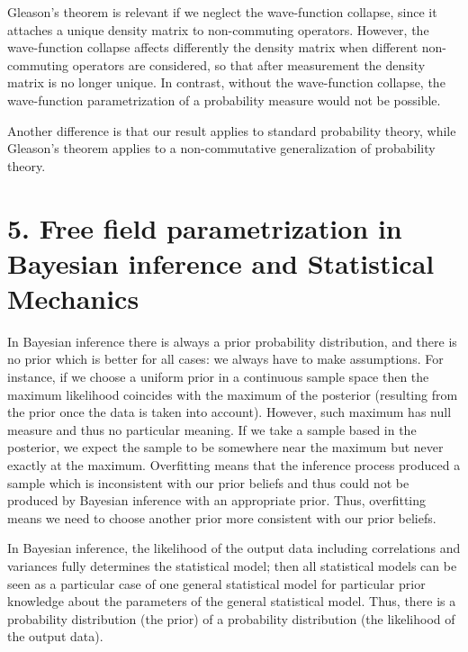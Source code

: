 \documentclass[11pt]{book}
\begin{document}
Gleason's theorem is relevant if we neglect the wave-function collapse,
since it attaches a unique density matrix to non-commuting operators.
However, the wave-function collapse affects differently the density
matrix when different non-commuting operators are considered, so that
after measurement the density matrix is no longer unique. In contrast,
without the wave-function collapse, the wave-function parametrization of
a probability measure would not be possible.

Another difference is that our result applies to standard probability
theory, while Gleason's theorem applies to a non-commutative
generalization of probability theory.

\hypertarget{free-field-parametrization-in-bayesian-inference-and-statistical-mechanics}{%
\section{5. Free field parametrization in Bayesian inference and
Statistical
Mechanics}\label{free-field-parametrization-in-bayesian-inference-and-statistical-mechanics}}

In Bayesian inference there is always a prior probability distribution,
and there is no prior which is better for all
cases\cite{dutchbook}: we
always have to make assumptions. For instance, if we choose a uniform
prior in a continuous sample space then the maximum likelihood coincides
with the maximum of the posterior (resulting from the prior once the
data is taken into account). However, such maximum has null measure and
thus no particular meaning. If we take a sample based in the posterior,
we expect the sample to be somewhere near the maximum but never exactly
at the maximum. Overfitting means that the inference process produced a
sample which is inconsistent with our prior beliefs and thus could not
be produced by Bayesian inference with an appropriate prior. Thus,
overfitting means we need to choose another prior more consistent with
our prior beliefs.

In Bayesian inference, the likelihood of the output data including
correlations and variances fully determines the statistical model; then
all statistical models can be seen as a particular case of one general
statistical model for particular prior knowledge about the parameters of
the general statistical
model\cite{https:ux2fux2fdoi.orgux2f10.48550ux2farxiv.2112.10510}. Thus, there is a probability distribution (the prior) of
a probability distribution (the likelihood of the output data).
\end{document}
